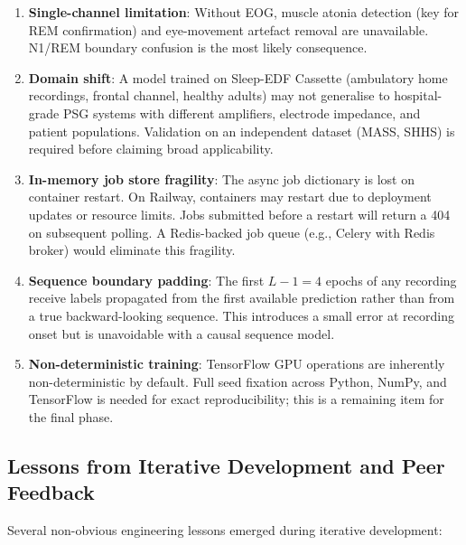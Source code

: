 \documentclass[10pt]{article}
\begin{document}
\begin{enumerate}
  \item \textbf{Single-channel limitation}: Without EOG, muscle atonia detection (key for REM confirmation) and eye-movement artefact removal are unavailable. N1/REM boundary confusion is the most likely consequence.
  \item \textbf{Domain shift}: A model trained on Sleep-EDF Cassette (ambulatory home recordings, frontal channel, healthy adults) may not generalise to hospital-grade PSG systems with different amplifiers, electrode impedance, and patient populations. Validation on an independent dataset (MASS, SHHS) is required before claiming broad applicability.
  \item \textbf{In-memory job store fragility}: The async job dictionary is lost on container restart. On Railway, containers may restart due to deployment updates or resource limits. Jobs submitted before a restart will return a 404 on subsequent polling. A Redis-backed job queue (e.g., Celery with Redis broker) would eliminate this fragility.
  \item \textbf{Sequence boundary padding}: The first $L-1=4$ epochs of any recording receive labels propagated from the first available prediction rather than from a true backward-looking sequence. This introduces a small error at recording onset but is unavoidable with a causal sequence model.
  \item \textbf{Non-deterministic training}: TensorFlow GPU operations are inherently non-deterministic by default. Full seed fixation across Python, NumPy, and TensorFlow is needed for exact reproducibility; this is a remaining item for the final phase.
\end{enumerate}

\subsection{Lessons from Iterative Development and Peer Feedback}
\label{sec:feedbackFoundations}

Several non-obvious engineering lessons emerged during iterative development:
\end{document}
